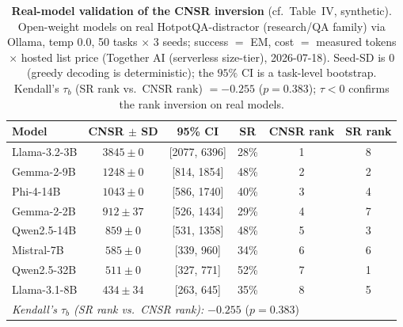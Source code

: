 \begin{table}[t]
\centering
\caption{\textbf{Real-model validation of the CNSR inversion} (cf.\ Table~IV, synthetic). Open-weight models on real HotpotQA-distractor (research/QA family) via Ollama, temp 0.0, 50 tasks $\times$ 3 seeds; success $=$ EM, cost $=$ measured tokens $\times$ hosted list price (Together AI (serverless size-tier), 2026-07-18). Seed-SD is $0$ (greedy decoding is deterministic); the $95\%$ CI is a task-level bootstrap. Kendall's $\tau_b$ (SR rank vs.\ CNSR rank) $=-0.255$ ($p=0.383$); $\tau<0$ confirms the rank inversion on real models.}
\label{tab:cnsr_ollama_real}
\begin{tabular}{lccccc}
\toprule
Model & CNSR $\pm$ SD & 95\% CI & SR & CNSR rank & SR rank \\
\midrule
Llama-3.2-3B & $3845 \pm 0$ & [2077, 6396] & 28\% & 1 & 8 \\
Gemma-2-9B & $1248 \pm 0$ & [814, 1854] & 48\% & 2 & 2 \\
Phi-4-14B & $1043 \pm 0$ & [586, 1740] & 40\% & 3 & 4 \\
Gemma-2-2B & $912 \pm 37$ & [526, 1434] & 29\% & 4 & 7 \\
Qwen2.5-14B & $859 \pm 0$ & [531, 1358] & 48\% & 5 & 3 \\
Mistral-7B & $585 \pm 0$ & [339, 960] & 34\% & 6 & 6 \\
Qwen2.5-32B & $511 \pm 0$ & [327, 771] & 52\% & 7 & 1 \\
Llama-3.1-8B & $434 \pm 34$ & [263, 645] & 35\% & 8 & 5 \\
\midrule
\multicolumn{6}{l}{\textit{Kendall's $\tau_b$ (SR rank vs.\ CNSR rank):} $-0.255$ ($p=0.383$)} \\
\bottomrule
\end{tabular}
\end{table}
